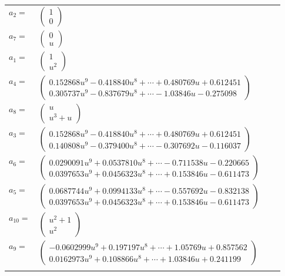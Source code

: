 \documentclass[1p]{elsarticle_modified}
\theoremstyle{definition}
\begin{document}
\begin{tabular}{m{7pt} m{180pt} m{7pt} m{180pt} }
\flushright $a_{2}=$&$\begin{pmatrix}1\\0\end{pmatrix}$ \\
\flushright $a_{7}=$&$\begin{pmatrix}0\\u\end{pmatrix}$ \\
\flushright $a_{1}=$&$\begin{pmatrix}1\\u^2\end{pmatrix}$ \\
\flushright $a_{4}=$&$\begin{pmatrix}0.152868 u^{9}-0.418840 u^{8}+\cdots+0.480769 u+0.612451\\0.305737 u^{9}-0.837679 u^{8}+\cdots-1.03846 u-0.275098\end{pmatrix}$ \\
\flushright $a_{8}=$&$\begin{pmatrix}u\\u^3+u\end{pmatrix}$ \\
\flushright $a_{3}=$&$\begin{pmatrix}0.152868 u^{9}-0.418840 u^{8}+\cdots+0.480769 u+0.612451\\0.140808 u^{9}-0.379400 u^{8}+\cdots-0.307692 u-0.116037\end{pmatrix}$ \\
\flushright $a_{6}=$&$\begin{pmatrix}0.0290091 u^{9}+0.0537810 u^{8}+\cdots-0.711538 u-0.220665\\0.0397653 u^{9}+0.0456323 u^{8}+\cdots+0.153846 u-0.611473\end{pmatrix}$ \\
\flushright $a_{5}=$&$\begin{pmatrix}0.0687744 u^{9}+0.0994133 u^{8}+\cdots-0.557692 u-0.832138\\0.0397653 u^{9}+0.0456323 u^{8}+\cdots+0.153846 u-0.611473\end{pmatrix}$ \\
\flushright $a_{10}=$&$\begin{pmatrix}u^2+1\\u^2\end{pmatrix}$ \\
\flushright $a_{9}=$&$\begin{pmatrix}-0.0602999 u^{9}+0.197197 u^{8}+\cdots+1.05769 u+0.857562\\0.0162973 u^{9}+0.108866 u^{8}+\cdots+1.03846 u+0.241199\end{pmatrix}$\\&\end{tabular}
\end{document}

